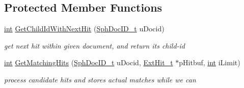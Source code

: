 \subsection*{Protected Member Functions}
\begin{DoxyCompactItemize}
\item 
\hyperlink{sphinxexpr_8cpp_a4a26e8f9cb8b736e0c4cbf4d16de985e}{int} \hyperlink{classExtOrder__c_a269a85287559982e444cc28868b5fc2e}{Get\-Child\-Id\-With\-Next\-Hit} (\hyperlink{sphinx_8h_a3176771631c12a9e4897272003e6b447}{Sph\-Doc\-I\-D\-\_\-t} u\-Docid)
\begin{DoxyCompactList}\small\item\em get next hit within given document, and return its child-\/id \end{DoxyCompactList}\item 
\hyperlink{sphinxexpr_8cpp_a4a26e8f9cb8b736e0c4cbf4d16de985e}{int} \hyperlink{classExtOrder__c_aff99196a9a6fcfaf0b9015218d6c6d69}{Get\-Matching\-Hits} (\hyperlink{sphinx_8h_a3176771631c12a9e4897272003e6b447}{Sph\-Doc\-I\-D\-\_\-t} u\-Docid, \hyperlink{structExtHit__t}{Ext\-Hit\-\_\-t} $\ast$p\-Hitbuf, \hyperlink{sphinxexpr_8cpp_a4a26e8f9cb8b736e0c4cbf4d16de985e}{int} i\-Limit)
\begin{DoxyCompactList}\small\item\em process candidate hits and stores actual matches while we can \end{DoxyCompactList}\end{DoxyCompactItemize}
